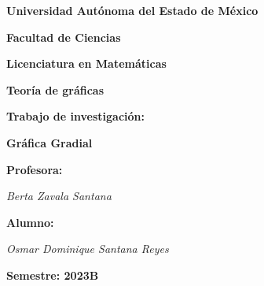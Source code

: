 \documentclass[fleqn, 11pt]{beamer}
\begin{document}
    \begin{titlepage}
        \centering
        \phantom{.}

        {\Huge \textbf{Universidad Autónoma del Estado de México}\par}
        \vspace{0.6cm}

        {\Huge \textbf{Facultad de Ciencias}\par}
        \vspace{0.6cm}

        {\Huge \textbf{Licenciatura en Matemáticas}\par}
        \vspace{1.2cm}

        {\Huge \textbf{Teoría de gráficas}\par}
        \vspace{1.1cm}

        {\Huge \textbf{Trabajo de investigación:}\par}

        {\huge \textbf{Gráfica Gradial}\par}
        \vspace{0.6cm}

        {\huge \textbf{Profesora:}\par}
        \vspace{0.3cm}
        {\huge \textsl{Berta Zavala Santana}}\par
        \vspace{0.6cm}

        {\huge \textbf{Alumno:}\par}
        \vspace{0.3cm}
        {\huge \textsl{Osmar Dominique Santana Reyes}}\par
        \vspace{1.2cm}

        {\huge \textbf{Semestre: 2023B}\par}

        \vspace{1.8cm}
        \par         %
    \end{titlepage}
\end{document}
